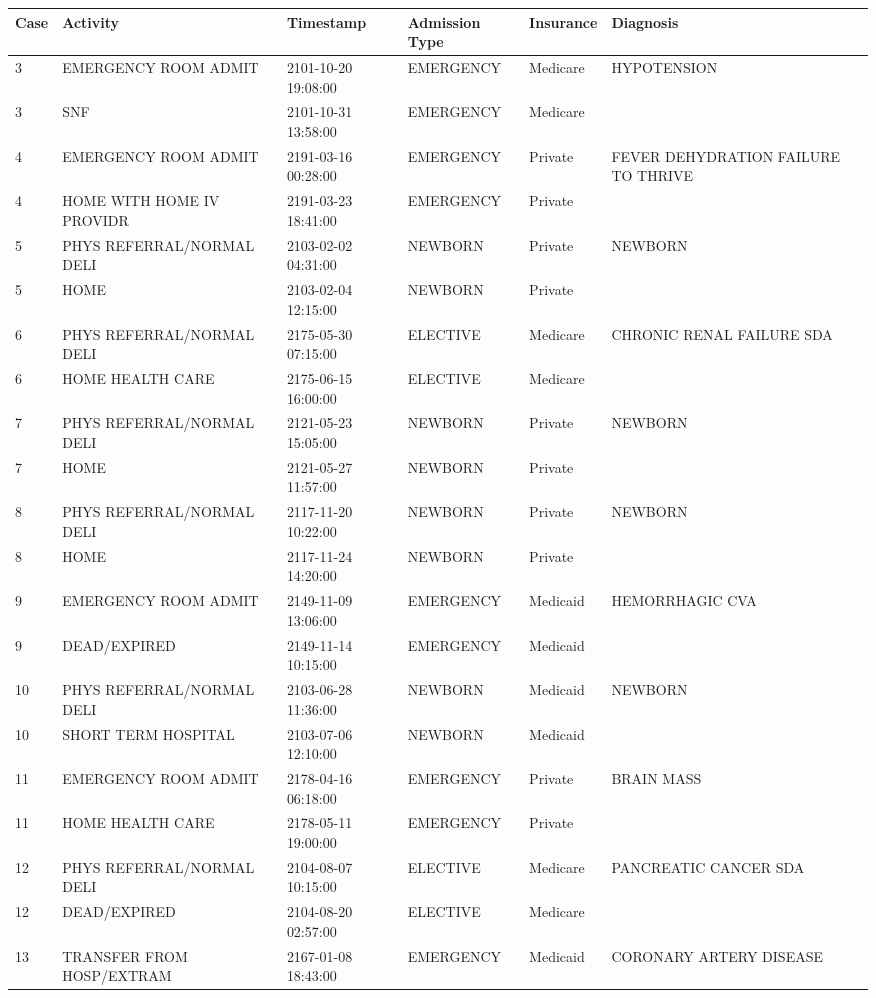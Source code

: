 \begin{appendices}
\begin{table}[!h]
	\tiny
	\setlength\tabcolsep{2pt}
	\begin{tabularx}{\textwidth}{lllllp{3.6cm}}
		\toprule
		\textbf{Case} & \textbf{Activity}          & \textbf{Timestamp} & \textbf{Admission Type} & \textbf{Insurance} & \textbf{Diagnosis} \\
		\midrule
3&EMERGENCY ROOM ADMIT&2101-10-20 19:08:00&EMERGENCY&Medicare&HYPOTENSION\\
3&SNF&2101-10-31 13:58:00&EMERGENCY&Medicare&\\
4&EMERGENCY ROOM ADMIT&2191-03-16 00:28:00&EMERGENCY&Private&FEVER DEHYDRATION FAILURE TO THRIVE\\
4&HOME WITH HOME IV PROVIDR&2191-03-23 18:41:00&EMERGENCY&Private&\\
5&PHYS REFERRAL/NORMAL DELI&2103-02-02 04:31:00&NEWBORN&Private&NEWBORN\\
5&HOME&2103-02-04 12:15:00&NEWBORN&Private&\\
6&PHYS REFERRAL/NORMAL DELI&2175-05-30 07:15:00&ELECTIVE&Medicare&CHRONIC RENAL FAILURE SDA\\
6&HOME HEALTH CARE&2175-06-15 16:00:00&ELECTIVE&Medicare&\\
7&PHYS REFERRAL/NORMAL DELI&2121-05-23 15:05:00&NEWBORN&Private&NEWBORN\\
7&HOME&2121-05-27 11:57:00&NEWBORN&Private&\\
8&PHYS REFERRAL/NORMAL DELI&2117-11-20 10:22:00&NEWBORN&Private&NEWBORN\\
8&HOME&2117-11-24 14:20:00&NEWBORN&Private&\\
9&EMERGENCY ROOM ADMIT&2149-11-09 13:06:00&EMERGENCY&Medicaid&HEMORRHAGIC CVA\\
9&DEAD/EXPIRED&2149-11-14 10:15:00&EMERGENCY&Medicaid&\\
10&PHYS REFERRAL/NORMAL DELI&2103-06-28 11:36:00&NEWBORN&Medicaid&NEWBORN\\
10&SHORT TERM HOSPITAL&2103-07-06 12:10:00&NEWBORN&Medicaid&\\
11&EMERGENCY ROOM ADMIT&2178-04-16 06:18:00&EMERGENCY&Private&BRAIN MASS\\
11&HOME HEALTH CARE&2178-05-11 19:00:00&EMERGENCY&Private&\\
12&PHYS REFERRAL/NORMAL DELI&2104-08-07 10:15:00&ELECTIVE&Medicare&PANCREATIC CANCER SDA\\
12&DEAD/EXPIRED&2104-08-20 02:57:00&ELECTIVE&Medicare&\\
13&TRANSFER FROM HOSP/EXTRAM&2167-01-08 18:43:00&EMERGENCY&Medicaid&CORONARY ARTERY DISEASE\\

\end{tabularx}
\end{table}
\end{appendices}
